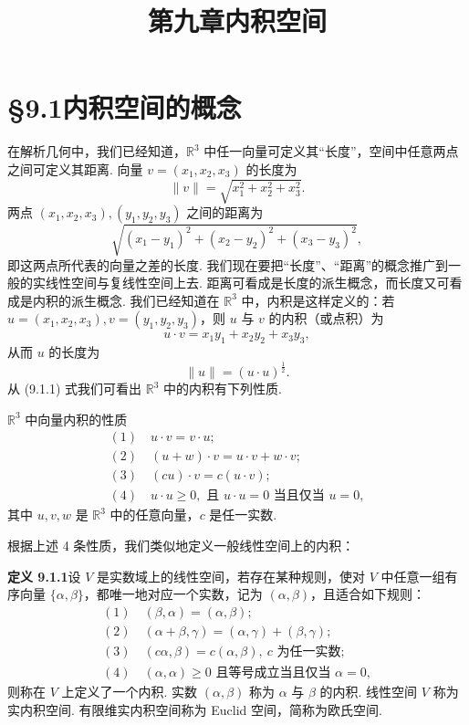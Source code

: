 \documentclass[UTF8,12pt,a4paper,fontset=fandol]{ctexart}
\title{第九章\quad 内积空间}
\author{}
\date{}
\begin{document}
\maketitle

\section*{§9.1\quad 内积空间的概念}

在解析几何中，我们已经知道，$\mathbb R^3$ 中任一向量可定义其``长度''，空间中任意两点之间可定义其距离. 向量 $v=(x_1,x_2,x_3)$ 的长度为
\[
  \|v\|=\sqrt{x_1^2+x_2^2+x_3^2}.
\]
两点 $(x_1,x_2,x_3),(y_1,y_2,y_3)$ 之间的距离为
\[
  \sqrt{(x_1-y_1)^2+(x_2-y_2)^2+(x_3-y_3)^2},
\]
即这两点所代表的向量之差的长度. 我们现在要把``长度''、``距离''的概念推广到一般的实线性空间与复线性空间上去. 距离可看成是长度的派生概念，而长度又可看成是内积的派生概念. 我们已经知道在 $\mathbb R^3$ 中，内积是这样定义的：若 $u=(x_1,x_2,x_3),v=(y_1,y_2,y_3)$，则 $u$ 与 $v$ 的内积（或点积）为
\begin{equation}
  u\cdot v=x_1y_1+x_2y_2+x_3y_3,
  \tag{9.1.1}
\end{equation}
从而 $u$ 的长度为
\[
  \|u\|=(u\cdot u)^{\frac12}.
\]
从 (9.1.1) 式我们可看出 $\mathbb R^3$ 中的内积有下列性质.

$\mathbb R^3$ 中向量内积的性质
\[
\begin{gathered}
  (1)\quad u\cdot v=v\cdot u;\\
  (2)\quad (u+w)\cdot v=u\cdot v+w\cdot v;\\
  (3)\quad (cu)\cdot v=c(u\cdot v);\\
  (4)\quad u\cdot u\ge 0,\text{ 且 }u\cdot u=0\text{ 当且仅当 }u=0,
\end{gathered}
\]
其中 $u,v,w$ 是 $\mathbb R^3$ 中的任意向量，$c$ 是任一实数.

根据上述 4 条性质，我们类似地定义一般线性空间上的内积：

\noindent\textbf{定义 9.1.1}\quad 设 $V$ 是实数域上的线性空间，若存在某种规则，使对 $V$ 中任意一组有序向量 $\{\alpha,\beta\}$，都唯一地对应一个实数，记为 $(\alpha,\beta)$，且适合如下规则：
\[
\begin{gathered}
  (1)\quad (\beta,\alpha)=(\alpha,\beta);\\
  (2)\quad (\alpha+\beta,\gamma)=(\alpha,\gamma)+(\beta,\gamma);\\
  (3)\quad (c\alpha,\beta)=c(\alpha,\beta),\ c\text{ 为任一实数};\\
  (4)\quad (\alpha,\alpha)\ge0\text{ 且等号成立当且仅当 }\alpha=0,
\end{gathered}
\]
则称在 $V$ 上定义了一个内积. 实数 $(\alpha,\beta)$ 称为 $\alpha$ 与 $\beta$ 的内积. 线性空间 $V$ 称为实内积空间. 有限维实内积空间称为 Euclid 空间，简称为欧氏空间.
\end{document}
